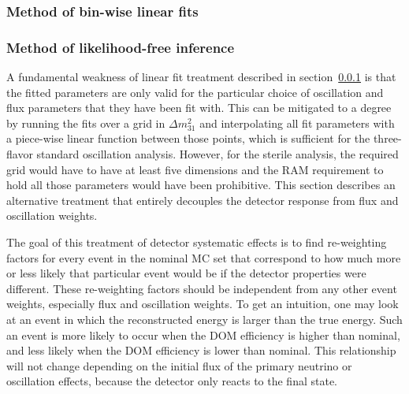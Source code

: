 \subsubsection{Method of bin-wise linear fits}
\label{sec:hypersurfaces}

\subsubsection{Method of likelihood-free inference}

A fundamental weakness of linear fit treatment described in section~\ref{sec:hypersurfaces} is that the fitted parameters are only valid for the particular choice of oscillation and flux parameters that they have been fit with. This can be mitigated to a degree by running the fits over a grid in $\Delta m^2_{31}$ and interpolating all fit parameters with a piece-wise linear function between those points, which is sufficient for the three-flavor standard oscillation analysis. However, for the sterile analysis, the required grid would have to have at least five dimensions and the RAM requirement to hold all those parameters would have been prohibitive. This section describes an alternative treatment that entirely decouples the detector response from flux and oscillation weights.

The goal of this treatment of detector systematic effects is to find re-weighting factors for every event in the nominal MC set that correspond to how much more or less likely that particular event would be if the detector properties were different. These re-weighting factors should be independent from any other event weights, especially flux and oscillation weights. To get an intuition, one may look at an event in which the reconstructed energy is larger than the true energy. Such an event is more likely to occur when the DOM efficiency is higher than nominal, and less likely when the DOM efficiency is lower than nominal. This relationship will not change depending on the initial flux of the primary neutrino or oscillation effects, because the detector only reacts to the final state.

